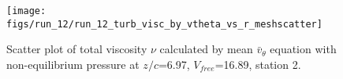 \begin{figure}[H]
\centering
\texttt{[image: figs/run\_12/run\_12\_turb\_visc\_by\_vtheta\_vs\_r\_meshscatter]}
\caption{Scatter plot of total viscosity $\nu$ calculated by mean $\bar{v}_{\theta}$ equation with non-equilibrium pressure at $z/c$=6.97, $V_{free}$=16.89, station 2.}
\label{fig:run_12_turb_visc_by_vtheta_vs_r_meshscatter}
\end{figure}


